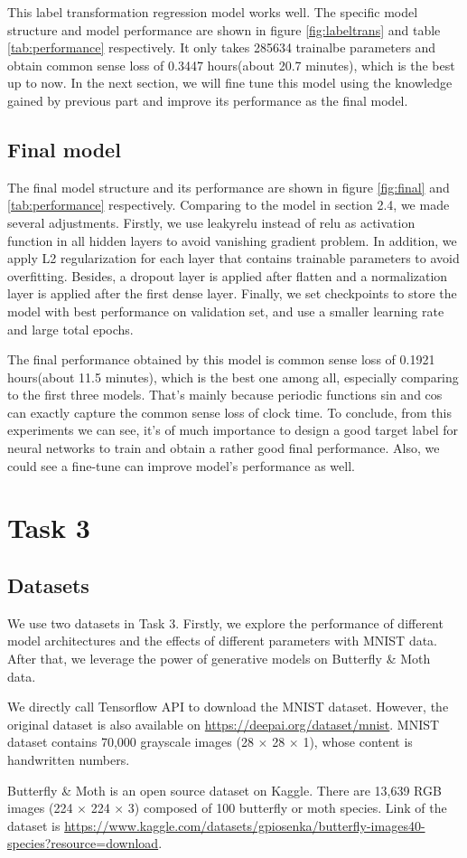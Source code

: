 \documentclass{article}
\begin{document}
This label transformation regression model works well. The specific model structure and model performance are shown in figure \ref{fig:labeltrans} and table \ref{tab:performance} respectively. It only takes 285634 trainalbe parameters and obtain common sense loss of 0.3447 hours(about 20.7 minutes), which is the best up to now. In the next section, we will fine tune this model using the knowledge gained by previous part and improve its performance as the final model.

\subsection{Final model}

The final model structure and its performance are shown in figure \ref{fig:final} and \ref{tab:performance} respectively. Comparing to the model in section 2.4, we made several adjustments. Firstly, we use leakyrelu instead of relu as activation function in all hidden layers to avoid vanishing gradient problem. In addition, we apply L2 regularization for each layer that contains trainable parameters to avoid overfitting. Besides, a dropout layer is applied after flatten and a normalization layer is applied after the first dense layer. Finally, we set checkpoints to store the model with best performance on validation set, and use a smaller learning rate and large total epochs.

The final performance obtained by this model is common sense loss of 0.1921 hours(about 11.5 minutes), which is the best one among all, especially comparing to the first three models. That's mainly because periodic functions sin and cos can exactly capture the common sense loss of clock time. To conclude, from this experiments we can see, it's of much importance to design a good target label for neural networks to train and obtain a rather good final performance.
Also, we could see a fine-tune can improve model's performance as well.
\section*{Task 3}
\setcounter{section}{3}
\setcounter{subsection}{0}
\subsection{Datasets}
We use two datasets in Task 3. Firstly, we explore the performance of different model architectures and the effects of different parameters with MNIST data. After that, we leverage the power of generative models on Butterfly \& Moth data. \par
We directly call Tensorflow API to download the MNIST dataset. However, the original dataset is also available on \url{https://deepai.org/dataset/mnist}. MNIST dataset contains 70,000 grayscale images (28 $\times$ 28 $\times$ 1), whose content is handwritten numbers. \par
Butterfly \& Moth is an open source dataset on Kaggle. There are 13,639 RGB images (224 $\times$ 224 $\times$ 3) composed of 100 butterfly or moth species. Link of the dataset is \url{https://www.kaggle.com/datasets/gpiosenka/butterfly-images40-species?resource=download}.
\end{document}
